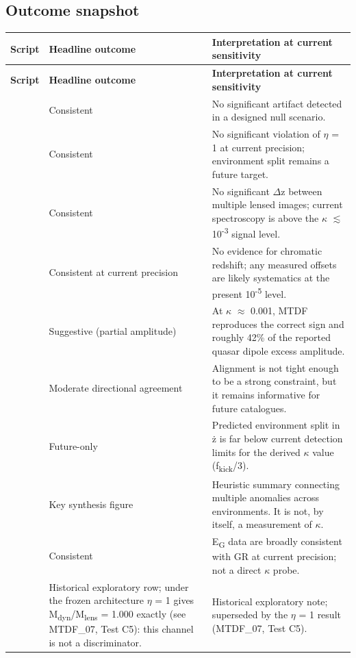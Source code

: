 \documentclass[11pt,a4paper]{article}
\begin{document}
\subsection{Outcome snapshot}
\begingroup\scriptsize
\begin{xltabular}{\linewidth}{>{\RaggedRight\arraybackslash}X>{\RaggedRight\arraybackslash}X>{\RaggedRight\arraybackslash}X}
\toprule
\textbf{Script} & \textbf{Headline outcome} & \textbf{Interpretation at current sensitivity} \tabularnewline
\midrule\endfirsthead
\toprule
\textbf{Script} & \textbf{Headline outcome} & \textbf{Interpretation at current sensitivity} \tabularnewline
\midrule\endhead
\bottomrule\endfoot
{\small\protect{}} & Consistent & No significant artifact detected in a designed null scenario. \tabularnewline
{\small\protect{}} & Consistent & No significant violation of $\eta$ = 1 at current precision; environment split remains a future target. \tabularnewline
{\small\protect{}} & Consistent & No significant $\Delta$z between multiple lensed images; current spectroscopy is above the $\kappa$ $\lesssim$ 10\textsuperscript{-3} signal level. \tabularnewline
{\small\protect{}} & Consistent at current precision & No evidence for chromatic redshift; any measured offsets are likely systematics at the present 10\textsuperscript{-5} level. \tabularnewline
{\small\protect{}} & Suggestive (partial amplitude) & At $\kappa$ $\approx$ 0.001, MTDF reproduces the correct sign and roughly 42\% of the reported quasar dipole excess amplitude. \tabularnewline
{\small\protect{}} & Moderate directional agreement & Alignment is not tight enough to be a strong constraint, but it remains informative for future catalogues. \tabularnewline
{\small\protect{}} & Future-only & Predicted environment split in \.{z} is far below current detection limits for the derived $\kappa$ value (f\textsubscript{kick}/3). \tabularnewline
{\small\protect{}} & Key synthesis figure & Heuristic summary connecting multiple anomalies across environments. It is not, by itself, a measurement of $\kappa$. \tabularnewline
{\small\protect{}} & Consistent & E\textsubscript{G} data are broadly consistent with GR at current precision; not a direct $\kappa$ probe. \tabularnewline
{\small\protect{}} & Historical exploratory row; under the frozen architecture $\eta$ = 1 gives M\textsubscript{dyn}/M\textsubscript{lens} = 1.000 exactly (see MTDF\_\allowbreak{}07, Test C5): this channel is not a discriminator. & Historical exploratory note; superseded by the $\eta$ = 1 result (MTDF\_\allowbreak{}07, Test C5). \tabularnewline

\end{xltabular}
\end{document}
